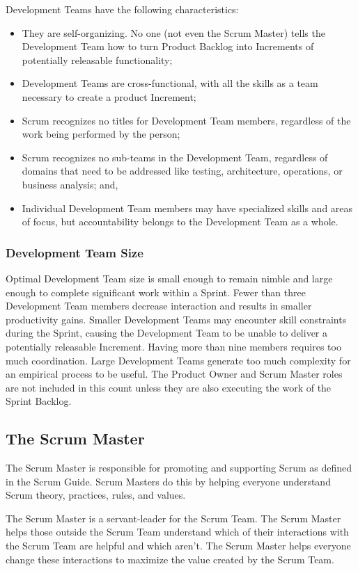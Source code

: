 Development Teams have the following characteristics:
\begin{itemize}
\item They are self-organizing. No one (not even the Scrum Master) tells the Development Team
      how to turn Product Backlog into Increments of potentially releasable functionality;
\item Development Teams are cross-functional, with all the skills as a team necessary to create a
      product Increment;
\item Scrum recognizes no titles for Development Team members, regardless of the work being
      performed by the person;
\item Scrum recognizes no sub-teams in the Development Team, regardless of domains that need
      to be addressed like testing, architecture, operations, or business analysis; and,
\item Individual Development Team members may have specialized skills and areas of focus, but
      accountability belongs to the Development Team as a whole.
\end{itemize}

\subsubsection{Development Team Size}
Optimal Development Team size is small enough to remain nimble and large enough to
complete significant work within a Sprint. Fewer than three Development Team members
decrease interaction and results in smaller productivity gains. Smaller Development Teams may
encounter skill constraints during the Sprint, causing the Development Team to be unable to
deliver a potentially releasable Increment. Having more than nine members requires too much
coordination. Large Development Teams generate too much complexity for an empirical process
to be useful. The Product Owner and Scrum Master roles are not included in this count unless
they are also executing the work of the Sprint Backlog.

\subsection{The Scrum Master}
The Scrum Master is responsible for promoting and supporting Scrum as defined in the Scrum
Guide. Scrum Masters do this by helping everyone understand Scrum theory, practices, rules,
and values.

The Scrum Master is a servant-leader for the Scrum Team. The Scrum Master helps those
outside the Scrum Team understand which of their interactions with the Scrum Team are helpful
and which aren't. The Scrum Master helps everyone change these interactions to maximize the
value created by the Scrum Team.

